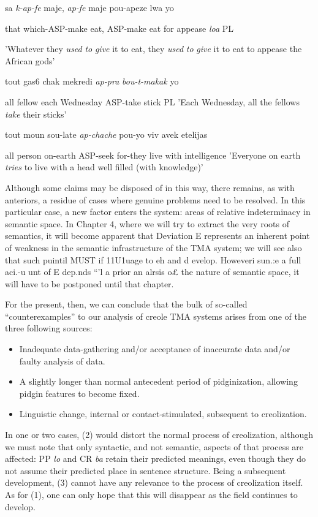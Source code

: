 \ea\label{ex:122}
 sa \textit{k-ap-fe} maje, \textit{ap-fe} maje pou-apeze lwa yo
\glt
\z

that which-ASP-make eat, ASP-make eat for appease \textit{loa} PL

'Whatever they \textit{used} \textit{to} \textit{give} it to eat, they \textit{used} \textit{to} \textit{give} it to eat to appease the African gods'

\ea\label{ex:123}
 tout gas6 chak mekredi \textit{ap-pra} \textit{bou-t-makak} yo
\glt
\z

all fellow each Wednesday ASP-take stick PL 'Each Wednesday, all the fellows \textit{take} their sticks'

\ea\label{ex:124}
 tout moun sou-late \textit{ap-chache} pou-yo viv avek etelijas
\glt
\z

all person on-earth ASP-seek for-they live with intelligence 'Everyone on earth \textit{tries }to live with a head well filled (with
knowledge)'

Although some claims may be disposed of in this way, there remains, as with anteriors, a residue of cases where genuine problems need to be resolved. In this particular case, a new factor enters the system: areas of relative indeterminacy in semantic space. In Chapter 4, where we will try to extract the very roots of semantics, it will become apparent that Deviation E represents an inherent point of weakness in the semantic infrastructure of the TMA system; we will see also that
such puintil MUST if 11U1uage to eh and d evelop. Howeveri sun.:e a full aci.-u unt of E dep.nds ``'l a prior an alrsis o£ the nature of semantic space, it will have to be postponed until that
chapter.

For the present, then, we can conclude that the bulk of so-called
``counterexamples'' to our analysis of creole TMA systems arises from one of the three following sources:


\begin{itemize}
\item Inadequate data-gathering and/or acceptance of inaccurate data and/or faulty analysis of data.
\item A slightly longer than normal antecedent period of pidginization, allowing pidgin features to become fixed. 
\item Linguistic change, internal or contact-stimulated, subsequent to creolization.
\end{itemize}

In one or two cases, (2) would distort the normal process of creoliza\-tion, although we must note that only syntactic, and not semantic, aspects of that process are affected: PP \textit{lo} and CR \textit{ba} retain their predicted meanings, even though they do not assume their predicted place in sentence structure. Being a subsequent development, (3) cannot have any relevance to the process of creolization itself. As for (1), one can only hope that this will disappear as the field continues to develop.

